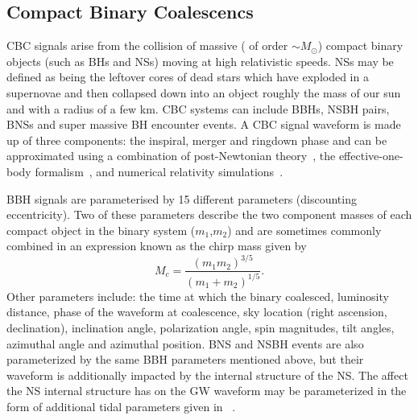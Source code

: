 \subsection{Compact Binary Coalescencs}\label{sec:CBC_source}

\ac{CBC} signals arise from the collision of massive 
( of order $\sim M_{\odot}$) compact 
binary objects (such as \ac{BH}s and \ac{NS}s) moving at high relativistic speeds. \ac{NS}s may be defined as being 
the leftover cores of dead stars which have 
exploded in a supernovae and then collapsed down into an object roughly 
the mass of our sun and with a radius of a few 
km. \ac{CBC} systems can 
include \ac{BBH}s, \ac{NSBH} pairs, \ac{BNS}s and super massive \ac{BH} encounter events.
A \ac{CBC} signal waveform is made up of three components: the inspiral, merger 
and ringdown phase and can be approximated using a combination 
of post-Newtonian theory~\cite{PhysRevD.84.049901,PhysRevD.80.084043,Blanchet2014,PhysRevD.93.084054},
the effective-one-body formalism~\cite{PhysRevD.59.084006}, and numerical
relativity simulations~\cite{PhysRevLett.95.121101}.

%
%
\ac{BBH} signals are parameterised by 15 different parameters (discounting 
eccentricity). Two of these  
parameters describe the two component masses of 
each compact object in the binary system ($m_1$,$m_2$) and are sometimes 
commonly combined in an expression known as the chirp mass given by 
%
\begin{equation}
    M_c = \frac{(m_1 m_2)^{3/5}}{(m_1 + m_2)^{1/5}}.
\end{equation} 
%
Other parameters include: the time at which the binary coalesced, luminosity distance, phase of the waveform at coalescence, sky 
location (right ascension, declination), 
inclination angle, polarization angle, spin magnitudes, tilt angles, 
azimuthal angle and azimuthal position. \ac{BNS} and \ac{NSBH} 
events are also parameterized by the 
same \ac{BBH} parameters mentioned above, but their waveform is 
additionally impacted by the internal structure of the \ac{NS}. The 
affect the \ac{NS} internal structure has on the \ac{GW} waveform 
may be parameterized in the form of 
additional tidal parameters given in ~\cite{PhysRevD.81.123016}. 

